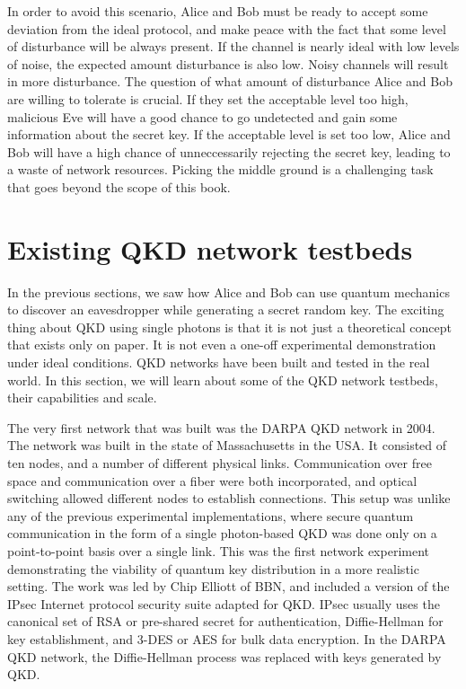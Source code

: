 In order to avoid this scenario, Alice and Bob must be ready to accept some deviation from the ideal protocol, and make peace with the fact that some level of disturbance will be always present.
If the channel is nearly ideal with low levels of noise, the expected amount disturbance is also low.
Noisy channels will result in more disturbance.
The question of what amount of disturbance Alice and Bob are willing to tolerate is crucial.
If they set the acceptable level too high, malicious Eve will have a good chance to go undetected and gain some information about the secret key.
If the acceptable level is set too low, Alice and Bob will have a high chance of unneccessarily rejecting the secret key, leading to a waste of network resources.
Picking the middle ground is a challenging task that goes beyond the scope of this book.





\section{Existing QKD network testbeds}
\label{sec:existing-qkd-networks}


In the previous sections, we saw how Alice and Bob can use quantum mechanics to discover an eavesdropper while generating a secret random key.
The exciting thing about QKD using single photons is that it is not just a theoretical concept that exists only on paper.
It is not even a one-off experimental demonstration under ideal conditions.
QKD networks have been built and tested in the real world.
In this section, we will learn about some of the QKD network testbeds, their capabilities and scale.

The very first network that was built was the DARPA QKD network in 2004.
The network was built in the state of Massachusetts in the USA.
It consisted of ten nodes, and a number of different physical links.
Communication over free space and communication over a fiber were both incorporated, and optical switching allowed different nodes to establish connections.
This setup was unlike any of the previous experimental implementations, where secure quantum communication in the form of a single photon-based QKD was done only on a point-to-point basis over a single link.
This was the first network experiment demonstrating the viability of quantum key distribution in a more realistic setting.
The work was led by Chip Elliott of BBN, and included a version of the IPsec Internet protocol security suite adapted for QKD.
IPsec usually uses the canonical set of RSA or pre-shared secret for authentication, Diffie-Hellman for key establishment, and 3-DES or AES for bulk data encryption.  In the DARPA QKD network, the Diffie-Hellman process was replaced with keys generated by QKD.

